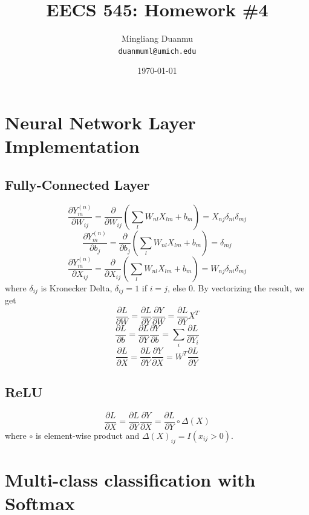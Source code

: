 \documentclass{article}
\title{EECS 545: Homework \#4} %
\author{Mingliang Duanmu\\ \texttt{duanmuml@umich.edu}} %
\date{\today} %
\begin{document}
\maketitle %

\section{Neural Network Layer Implementation}

\subsection*{Fully-Connected Layer}

$$\frac{\partial Y_m^{(n)}}{\partial W_{ij}} = \frac{\partial}{\partial W_{ij}} (\sum_l W_{nl}X_{lm} + b_m) = X_{nj}\delta_{ni}\delta_{mj}$$
$$\frac{\partial Y_m^{(n)}}{\partial b_j} = \frac{\partial}{\partial b_j} (\sum_l W_{nl}X_{lm} + b_m) = \delta_{mj}$$
$$\frac{\partial Y_m^{(n)}}{\partial X_{ij}} = \frac{\partial}{\partial X_{ij}} (\sum_l W_{nl}X_{lm} + b_m) = W_{nj}\delta_{ni}\delta_{mj}$$
where $\delta_{ij}$ is Kronecker Delta, $\delta_{ij} = 1$ if $i=j$, else $0$. By vectorizing the result, we get
$$\frac{\partial L}{\partial W} = \frac{\partial L}{\partial Y}\frac{\partial Y}{\partial W} = \frac{\partial L}{\partial Y} X^T$$
$$\frac{\partial L}{\partial b} = \frac{\partial L}{\partial Y}\frac{\partial Y}{\partial b} = \sum_i \frac{\partial L}{\partial Y_i}$$
$$\frac{\partial L}{\partial X} = \frac{\partial L}{\partial Y}\frac{\partial Y}{\partial X} = W^T \frac{\partial L}{\partial Y}$$

\subsection*{ReLU}

$$\frac{\partial L}{\partial X} = \frac{\partial L}{\partial Y}\frac{\partial Y}{\partial X} = \frac{\partial L}{\partial Y} \circ \Delta(X)$$
where $\circ$ is element-wise product and $\Delta(X)_{ij} = I(x_{ij} > 0)$.

\newpage

\section{Multi-class classification with Softmax}
\end{document}
